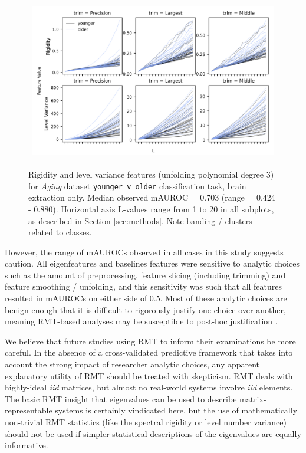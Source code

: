 \documentclass[12pt]{spieman}  %
\begin{document}
\begin{spacing}{2}
\begin{figure}
\begin{center}
\begin{tabular}{c}
\includegraphics[width=6.5in]{observables_older_younger_v_older.png}
\end{tabular}
\end{center}
\caption
{ \label{fig:observables} Rigidity and level variance features (unfolding
polynomial degree 3) for \textit{Aging} dataset \footnotesize\texttt{younger v
older} classification task, brain extraction only. Median observed mAUROC =
0.703 (range = 0.424 - 0.880). Horizontal axis L-values range from 1 to 20 in
all subplots, as described in Section \ref{sec:methods}. Note banding / clusters
related to classes.}
\end{figure}

However, the range of mAUROCs observed in all cases in this study suggests
caution. All eigenfeatures and baselines features were sensitive to analytic
choices such as the amount of preprocessing, feature slicing (including trimming) and
feature smoothing / unfolding, and this sensitivity was such that all features
resulted in mAUROCs on either side of 0.5. Most of these analytic choices are benign enough that
it is difficult to rigorously justify one choice over another, meaning RMT-based
analyses may be susceptible to post-hoc justification \cite{kerrHARKingHypothesizingResults1998}.



We believe that future studies using RMT to inform their examinations be more
careful. In the absence of a cross-validated predictive framework that takes
into account the strong impact of researcher analytic choices, any apparent
explanatory utility of RMT should be treated with skepticism. RMT deals with
highly-ideal \textit{iid} matrices, but almost no real-world systems involve
\textit{iid} elements. The basic RMT insight that eigenvalues can be used to
describe matrix-representable systems is certainly vindicated here, but the use
of mathematically non-trivial RMT statistics (like the spectral rigidity or
level number variance) should not be used if simpler statistical descriptions
of the eigenvalues are equally informative.


\end{spacing}
\end{document}
